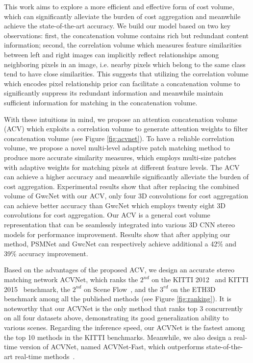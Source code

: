 \documentclass[10pt,twocolumn,letterpaper]{article}
\begin{document}
This work aims to explore a more efficient and effective form of cost volume, which can significantly alleviate the burden of cost aggregation
and meanwhile achieve the state-of-the-art accuracy. 
We build our model based on two key observations: first, the concatenation volume contains rich but redundant content information;
second, the correlation volume which measures feature similarities between left and right images can implicitly reflect relationships among neighboring pixels in an image, i.e. nearby pixels which belong to the same class tend to have close similarities. This suggests that utilizing the correlation volume which encodes pixel relationship prior can facilitate a concatenation volume to significantly suppress its redundant information and meanwhile maintain sufficient information for matching in the concatenation volume.

With these intuitions in mind, 
we propose an attention concatenation volume (ACV) which exploits a correlation volume to generate attention weights to filter concatenation volume (see Figure \ref{fig:acvnet}). To have a reliable correlation volume, we propose a novel multi-level adaptive patch matching method to produce more accurate similarity measures, which employs multi-size patches with adaptive weights for matching pixels at different feature levels. The ACV can achieve a higher accuracy and meanwhile significantly alleviate the burden of cost aggregation. Experimental results show that after replacing the combined volume of GwcNet with our ACV, only four 3D convolutions for cost aggregation can achieve better accuracy than GwcNet which employs twenty eight 3D convolutions for cost aggregation. Our ACV is a general cost volume representation that can be seamlessly integrated into various 3D CNN stereo models for performance improvement. Results show that after applying our method, PSMNet and GwcNet  can respectively achieve additional a 42\% and 39\% accuracy improvement.


Based on the advantages of the proposed ACV, we design an accurate stereo matching network ACVNet, which ranks the $2^{nd}$ on the KITTI 2012~\cite{geiger2012we} and KITTI 2015~\cite{menze2015joint} benchmark, the $2^{nd}$ on Scene Flow~\cite{dispNetC2016large}, and the $3^{rd}$ on the ETH3D~\cite{schops2017multi} benchmark among all the published methods (see Figure \ref{fig:ranking}). 
It is noteworthy that our ACVNet is the only method that ranks top 3 concurrently on all four datasets above, demonstrating its good generalization ability to various scenes. Regarding the inference speed, our ACVNet is the fastest among the top 10 methods in the KITTI benchmarks.
Meanwhile, we also design a real-time version of ACVNet, named ACVNet-Fast, which outperforms state-of-the-art real-time methods~\cite{stereonet2018, xu2020aanet, deeppruner2019, yao2021decomposition}.
\vspace{0.1cm}
\end{document}

